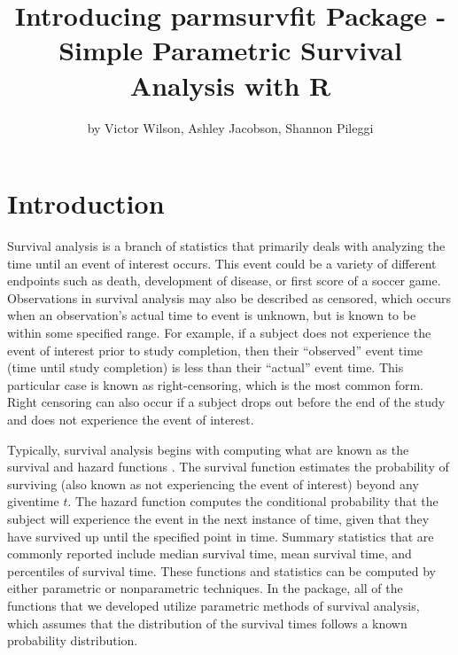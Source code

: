 \title{Introducing parmsurvfit Package - Simple Parametric Survival Analysis
with R}
\author{by Victor Wilson, Ashley Jacobson, Shannon Pileggi}

\maketitle



\hypertarget{introduction}{%
\section{Introduction}\label{introduction}}

Survival analysis is a branch of statistics that primarily deals with
analyzing the time until an event of interest occurs. This event could
be a variety of different endpoints such as death, development of
disease, or first score of a soccer game. Observations in survival
analysis may also be described as censored, which occurs when an
observation's actual time to event is unknown, but is known to be within
some specified range. For example, if a subject does not experience the
event of interest prior to study completion, then their ``observed''
event time (time until study completion) is less than their ``actual''
event time. This particular case is known as right-censoring, which is
the most common form. Right censoring can also occur if a subject drops
out before the end of the study and does not experience the event of
interest.

Typically, survival analysis begins with computing what are known as the
survival and hazard functions \citep{Kleinbaum2012}. The survival
function estimates the probability of surviving (also known as not
experiencing the event of interest) beyond any giventime \(t\). The
hazard function computes the conditional probability that the subject
will experience the event in the next instance of time, given that they
have survived up until the specified point in time. Summary statistics
that are commonly reported include median survival time, mean survival
time, and percentiles of survival time. These functions and statistics
can be computed by either parametric or nonparametric techniques. In the
 package, all of the functions that we developed
utilize parametric methods of survival analysis, which assumes that the
distribution of the survival times follows a known probability
distribution.


